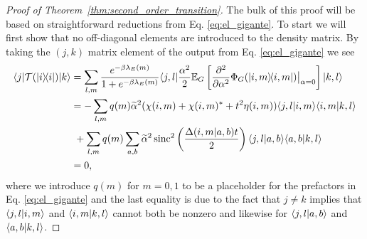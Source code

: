 \begin{proof}[Proof of Theorem~\ref{thm:second_order_transition}]
    The bulk of this proof will be based on straightforward reductions from Eq. \eqref{eq:el_gigante}. To start we will first show that no off-diagonal elements are introduced to the density matrix. By taking the $(j,k)$ matrix element of the output from Eq. \eqref{eq:el_gigante} we see
    \begin{align}
        \langle j| \mathcal{T}(| i\rangle\! \langle i|)|k\rangle &= \sum_{l, m} \frac{e^{-\beta \lambda_E(m)}}{1 + e^{-\beta \lambda_E(m)}} \langle j, l| \frac{\alpha^2}{2} \mathbb{E}_{G} \left[ \frac{\partial^2}{\partial \alpha^2} \Phi_G(| i, m\rangle\! \langle i, m|) \big|_{\alpha = 0} \right] |k, l\rangle \\
        &= - \sum_{l,m} q(m) \widetilde{\alpha}^2 (\chi(i,m) + \chi(i,m)^* + t^2 \eta(i,m)) \langle j, l|i, m\rangle \langle i, m|k, l\rangle \nonumber \\
        &~ + \sum_{l, m} q(m) \sum_{a,b} \widetilde{\alpha}^2 \operatorname{sinc}^2 \left(\frac{\Delta(i,m|a,b)t }{2} \right) \langle j, l|a,b\rangle \langle a, b|k, l\rangle \\
        &= 0,
    \end{align}
    where we introduce $q(m)$ for $m=0,1$ to be a placeholder for the prefactors in Eq. \eqref{eq:el_gigante} and the last equality is due to the fact that $j \neq k$ implies that $\langle j, l|i,m\rangle$ and $\langle i,m|k, l\rangle$ cannot both be nonzero and likewise for $\langle j, l|a,b\rangle$ and $\langle a,b|k,l\rangle$.
    

\end{proof}
